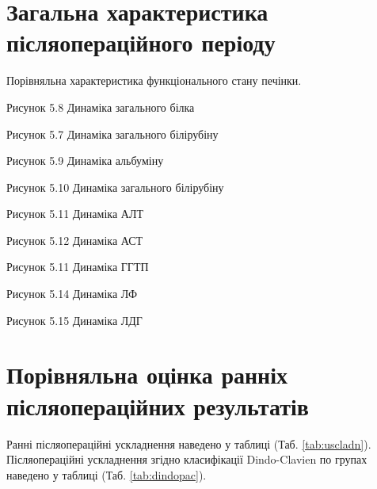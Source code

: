 \section{Загальна характеристика післяопераційного періоду}
Порівняльна характеристика функціонального стану печінки.

Рисунок 5.8 Динаміка загального білка

Рисунок 5.7 Динаміка загального білірубіну

Рисунок 5.9 Динаміка альбуміну

Рисунок 5.10 Динаміка загального білірубіну

Рисунок 5.11 Динаміка АЛТ

Рисунок 5.12 Динаміка АСТ

Рисунок 5.11 Динаміка ГГТП

Рисунок 5.14 Динаміка ЛФ

Рисунок 5.15 Динаміка ЛДГ

\section{Порівняльна оцінка ранніх післяопераційних результатів}

Ранні післяопераційні ускладнення наведено у таблиці (Таб. \ref{tab:uscladn}). 
Післяопераційні ускладнення згідно класифікації Dindo-Clavien по групах наведено у таблиці (Таб. \ref{tab:dindopac}). 


